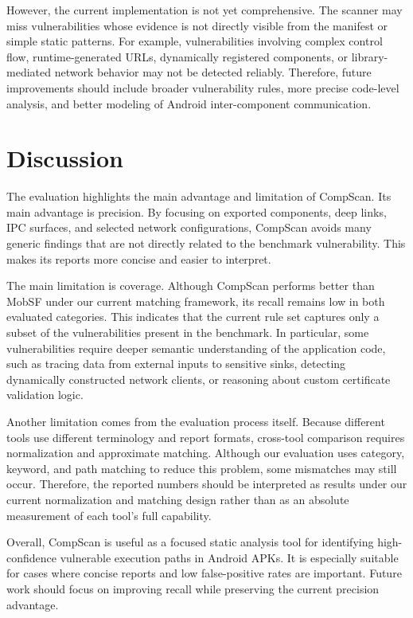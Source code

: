 \documentclass[sigconf, nonacm]{acmart}
\begin{document}
However, the current implementation is not yet comprehensive. The scanner may miss vulnerabilities whose evidence is not directly visible from the manifest or simple static patterns. For example, vulnerabilities involving complex control flow, runtime-generated URLs, dynamically registered components, or library-mediated network behavior may not be detected reliably. Therefore, future improvements should include broader vulnerability rules, more precise code-level analysis, and better modeling of Android inter-component communication.

\section{Discussion}

The evaluation highlights the main advantage and limitation of CompScan. Its main advantage is precision. By focusing on exported components, deep links, IPC surfaces, and selected network configurations, CompScan avoids many generic findings that are not directly related to the benchmark vulnerability. This makes its reports more concise and easier to interpret.

The main limitation is coverage. Although CompScan performs better than MobSF under our current matching framework, its recall remains low in both evaluated categories. This indicates that the current rule set captures only a subset of the vulnerabilities present in the benchmark. In particular, some vulnerabilities require deeper semantic understanding of the application code, such as tracing data from external inputs to sensitive sinks, detecting dynamically constructed network clients, or reasoning about custom certificate validation logic.

Another limitation comes from the evaluation process itself. Because different tools use different terminology and report formats, cross-tool comparison requires normalization and approximate matching. Although our evaluation uses category, keyword, and path matching to reduce this problem, some mismatches may still occur. Therefore, the reported numbers should be interpreted as results under our current normalization and matching design rather than as an absolute measurement of each tool's full capability.

Overall, CompScan is useful as a focused static analysis tool for identifying high-confidence vulnerable execution paths in Android APKs. It is especially suitable for cases where concise reports and low false-positive rates are important. Future work should focus on improving recall while preserving the current precision advantage.
\end{document}
